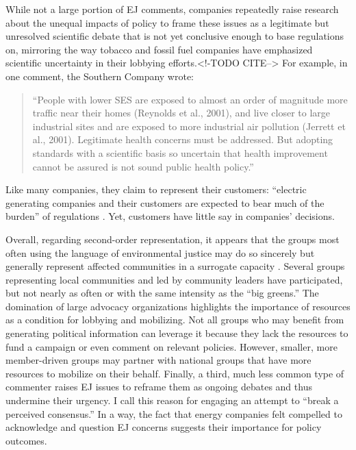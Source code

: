 \documentclass[
      12pt,
        ]{article}
\begin{document}
While not a large portion of EJ comments, companies repeatedly raise research about the unequal impacts of policy to frame these issues as a legitimate but unresolved scientific debate that is not yet conclusive enough to base regulations on, mirroring the way tobacco and fossil fuel companies have emphasized scientific uncertainty in their lobbying efforts.\textless!-TODO CITE--\textgreater{}
For example, in one comment, the Southern Company wrote:

\begin{quote}
``People with lower SES are exposed to almost an order of magnitude
more traffic near their homes (Reynolds et al., 2001), and live closer
to large industrial sites and are exposed to more industrial air
pollution (Jerrett et al., 2001). Legitimate health concerns must be
addressed. But adopting standards with a scientific basis so uncertain
that health improvement cannot be assured is not sound public health
policy.''
\end{quote}

Like many companies, they claim to represent their customers:
``electric generating companies and their customers are expected to bear
much of the burden'' of regulations \citep{Hobson2004}. Yet, customers have little say in companies' decisions.

Overall, regarding second-order representation, it appears that the groups
most often using the language of environmental justice may do so
sincerely but generally represent affected communities in a surrogate capacity \citep{Mansbridge2003}. Several groups representing local communities and led by community leaders have
participated, but not nearly as often or with the same intensity as the
``big greens.'' The domination of large advocacy organizations highlights the importance of resources as a condition
for lobbying and mobilizing. Not all groups who may benefit from generating political
information can leverage it because they lack the resources to
fund a campaign or even comment on relevant policies. However, smaller, more
member-driven groups may partner with national groups that have more resources to
mobilize on their behalf.
Finally, a third, much less common type of commenter raises EJ issues
to reframe them as ongoing debates and thus undermine their
urgency. I call this reason for engaging an attempt to ``break a perceived
consensus.'' In a way, the fact that energy companies felt compelled to
acknowledge and question EJ concerns suggests their
importance for policy outcomes.
\end{document}
